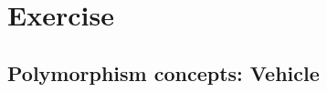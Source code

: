 \documentclass[oneside,11pt,dvipsnames]{book}
\begin{document}



\section{Exercise}



\subsection{Polymorphism concepts: Vehicle}\label{exercise:vehicle}
\end{document}
